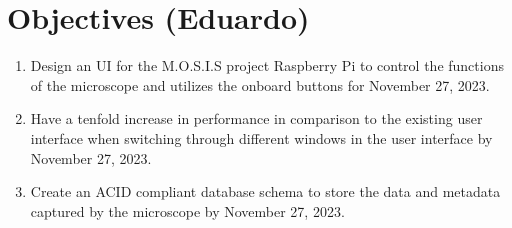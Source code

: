 \section{Objectives (Eduardo)}
\begin{enumerate}
    \item Design an UI for the M.O.S.I.S project Raspberry Pi to control the functions of the microscope and utilizes the onboard buttons for November 27, 2023. 
    \item Have a tenfold increase in performance in comparison to the existing user interface when switching through different windows in the user interface by November 27, 2023.
    \item Create an ACID compliant database schema to store the data and metadata captured by the microscope by November 27, 2023. %
\end{enumerate}